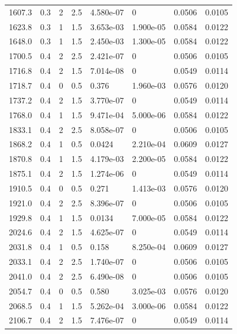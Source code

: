 \documentclass[preview]{standalone}
\begin{document}
{{\begin{tabular}{L{1.2cm}C{1.2cm} C{0.3cm}C{0.5cm} C{1.4cm}C{1.4cm} C{1.4cm}C{1.4cm}}
  1607.3  &   0.3  & 2     & 2.5 &  4.580e-07  & 0  & 0.0506 &  0.0105   \\ 
  1623.8  &   0.3  & 1     & 1.5 &  3.653e-03  & 1.900e-05  & 0.0584 &  0.0122   \\ 
  1648.0  &   0.3  & 1     & 1.5 &  2.450e-03  & 1.300e-05  & 0.0584 &  0.0122   \\ 
  1700.5  &   0.4  & 2     & 2.5 &  2.421e-07  & 0  & 0.0506 &  0.0105   \\ 
  1716.8  &   0.4  & 2     & 1.5 &  7.014e-08  & 0  & 0.0549 &  0.0114   \\ 
  1718.7  &   0.4  & 0     & 0.5 &  0.376  & 1.960e-03  & 0.0576 &  0.0120   \\ 
  1737.2  &   0.4  & 2     & 1.5 &  3.770e-07  & 0  & 0.0549 &  0.0114   \\ 
  1768.0  &   0.4  & 1     & 1.5 &  9.471e-04  & 5.000e-06  & 0.0584 &  0.0122   \\ 
  1833.1  &   0.4  & 2     & 2.5 &  8.058e-07  & 0  & 0.0506 &  0.0105   \\ 
  1868.2  &   0.4  & 1     & 0.5 &  0.0424  & 2.210e-04  & 0.0609 &  0.0127   \\ 
  1870.8  &   0.4  & 1     & 1.5 &  4.179e-03  & 2.200e-05  & 0.0584 &  0.0122   \\ 
  1875.1  &   0.4  & 2     & 1.5 &  1.274e-06  & 0  & 0.0549 &  0.0114   \\ 
  1910.5  &   0.4  & 0     & 0.5 &  0.271  & 1.413e-03  & 0.0576 &  0.0120   \\ 
  1921.0  &   0.4  & 2     & 2.5 &  8.396e-07  & 0  & 0.0506 &  0.0105   \\ 
  1929.8  &   0.4  & 1     & 1.5 &  0.0134  & 7.000e-05  & 0.0584 &  0.0122   \\ 
  2024.6  &   0.4  & 2     & 1.5 &  4.625e-07  & 0  & 0.0549 &  0.0114   \\ 
  2031.8  &   0.4  & 1     & 0.5 &  0.158  & 8.250e-04  & 0.0609 &  0.0127   \\ 
  2033.1  &   0.4  & 2     & 2.5 &  1.740e-07  & 0  & 0.0506 &  0.0105   \\ 
  2041.0  &   0.4  & 2     & 2.5 &  6.490e-08  & 0  & 0.0506 &  0.0105   \\ 
  2054.7  &   0.4  & 0     & 0.5 &  0.580  & 3.025e-03  & 0.0576 &  0.0120   \\ 
  2068.5  &   0.4  & 1     & 1.5 &  5.262e-04  & 3.000e-06  & 0.0584 &  0.0122   \\ 
  2106.7  &   0.4  & 2     & 1.5 &  7.476e-07  & 0  & 0.0549 &  0.0114   \\ 

\end{tabular}}}
\end{document}
